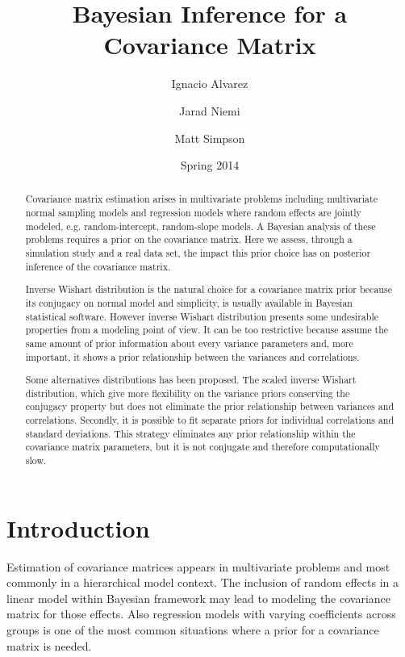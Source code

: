 \documentclass[a4paper]{article}
\title{Bayesian Inference for a Covariance Matrix}
\author{Ignacio Alvarez \and Jarad Niemi \and Matt Simpson  \nacho{Is the names order right?} }
\date{ Spring 2014 }
\begin{document}
 
\maketitle 


\begin{abstract}
Covariance matrix estimation arises in multivariate problems including multivariate normal sampling models and regression models where random effects are jointly modeled, e.g. random-intercept, random-slope models. A Bayesian analysis of these problems requires a prior on the covariance matrix. Here we assess, through a simulation study and a real data set, the impact this prior choice has on posterior inference of the covariance matrix.

Inverse Wishart distribution is the natural choice for a covariance matrix prior because its conjugacy on normal model and simplicity, is usually available in Bayesian statistical software. However inverse Wishart distribution presents some undesirable properties from a modeling point of view. It can be too restrictive because assume the same amount of prior information about every variance parameters and, more important, it shows a prior relationship between the variances and correlations. 

Some alternatives distributions has been proposed. The scaled inverse Wishart distribution, which give more flexibility on the variance priors conserving the conjugacy property but does not eliminate the prior relationship between variances and correlations. Secondly, it is possible to fit separate priors for individual correlations and standard deviations. This strategy eliminates any prior relationship within the covariance matrix parameters, but it is not conjugate and therefore computationally slow. 
\end{abstract}


\newpage 

{} 

\section{Introduction} 

Estimation of covariance matrices appears in multivariate problems and most commonly in a hierarchical model context. The inclusion of random effects in a linear model within Bayesian framework may lead to modeling the covariance matrix for those effects. Also regression models with varying coefficients across groups is one of the most common situations where a prior for a covariance matrix is needed. 
\end{document}
